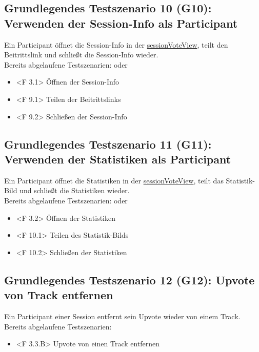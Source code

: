\documentclass[oneside, ngerman]{sdqtechreport}
\begin{document}
\subsection{Grundlegendes Testszenario 10 (G10): Verwenden der Session-Info als Participant}
\label{subsec:Tests:GrundlegendeTestszenarien:G10}
\hypertarget{G10}{}
\newcommand{\gTen}{\hyperlink{G10}{G10: Verwenden der Session-Info als Participant }}
Ein Participant öffnet die Session-Info in der \hyperlink{sessionVoteView}{sessionVoteView}, teilt den Beitrittslink und schließt die Session-Info wieder. \\
Bereits abgelaufene Testszenarien: \gTwo oder \gThree
\begin{itemize}
    \item <F 3.1> Öffnen der Session-Info
    \item <F 9.1> Teilen der Beitrittslinks
    \item <F 9.2> Schließen der Session-Info
\end{itemize}


\subsection{Grundlegendes Testszenario 11 (G11): Verwenden der Statistiken als Participant}
\label{subsec:Tests:GrundlegendeTestszenarien:G11}
\hypertarget{G11}{}
\newcommand{\gEleven}{\hyperlink{G11}{G11: Verwenden der Statistiken als Participant }}
Ein Participant öffnet die Statistiken in der \hyperlink{sessionVoteView}{sessionVoteView}, teilt das Statistik-Bild und schließt die Statistiken wieder. \\
Bereits abgelaufene Testszenarien: \gTwo oder \gThree
\begin{itemize}
    \item <F 3.2> Öffnen der Statistiken
    \item <F 10.1> Teilen des Statistik-Bilds
    \item <F 10.2> Schließen der Statistiken
\end{itemize}


\subsection{Grundlegendes Testszenario 12 (G12): Upvote von Track entfernen}
\label{subsec:Tests:GrundlegendeTestszenarien:G12}
\hypertarget{G12}{}
\newcommand{\gTwelve}{\hyperlink{G12}{G12: Upvote von Track entfernen }}
Ein Participant einer Session entfernt sein Upvote wieder von einem Track. \\
Bereits abgelaufene Testszenarien: \gSix
\begin{itemize}
    \item <F 3.3.B> Upvote von einen Track entfernen
\end{itemize}
\end{document}
